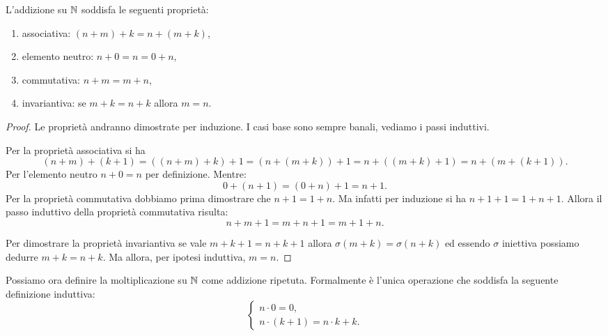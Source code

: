 \begin{theorem}\label{th:proprieta_addizione}
  L'addizione su ${\mathbb N}$ soddisfa le seguenti 
  proprietà:
  \begin{enumerate}
    \item associativa: $(n+m)+k = n + (m + k)$,
    \item elemento neutro: $n+0 = n = 0+n$,
    \item commutativa: $n+m = m+n$,
    \item invariantiva: se $m+k = n+k$ allora $m=n$.
  \end{enumerate}
\end{theorem}
\begin{proof}
Le proprietà andranno dimostrate per induzione.
I casi base sono sempre banali, vediamo i passi induttivi.

Per la proprietà associativa si ha
\[
(n+m)+(k+1) 
= ((n+m)+k)+1 
= (n+(m+k))+1
= n +((m+k)+1)
= n + (m + (k+1)).
\]
Per l'elemento neutro $n+0=n$ per definizione. Mentre:
\[
0+(n+1) = (0+n)+1 = n+1.
\]
Per la proprietà commutativa dobbiamo prima dimostrare che $n+1=1+n$.
Ma infatti per induzione si ha $n+1+1 = 1+n+1$.
Allora il passo induttivo della proprietà commutativa risulta:
\[
n + m + 1 
= m + n + 1
= m + 1 + n.
\]

Per dimostrare la proprietà invariantiva se vale $m+k+1=n+k+1$
allora $\sigma(m+k)=\sigma(n+k)$ ed essendo $\sigma$ iniettiva 
possiamo dedurre $m+k=n+k$. Ma allora, per ipotesi induttiva, $m=n$. 
\end{proof}



Possiamo ora definire la moltiplicazione su ${\mathbb N}$ come addizione ripetuta.
Formalmente è l'unica operazione che soddisfa la seguente definizione 
induttiva:
\[
\begin{cases}
  n\cdot 0 = 0,\\
  n\cdot(k+1) = n\cdot k + k.
\end{cases}  
\]

